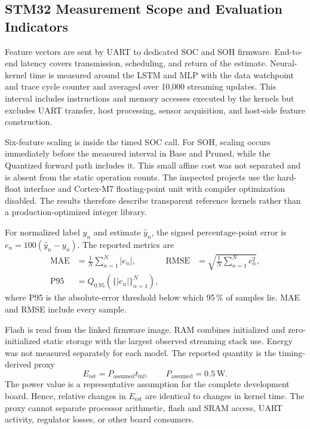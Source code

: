\documentclass[
    a4paper,
    12pt,
    titlepage,
    bibliography=totoc,
    twoside=on,
    parskip=false,
    numbers=noenddot,
    cleardoublepage=empty,
    DIV=12,
    BCOR=12.0mm,
    headheight=36pt,
    headings=openright
]{scrreprt}
\begin{document}
\subsection{STM32 Measurement Scope and Evaluation Indicators}
Feature vectors are sent by UART to dedicated SOC and SOH firmware. End-to-end latency covers transmission, scheduling, and return of the estimate. Neural-kernel time is measured around the LSTM and MLP with the data watchpoint and trace cycle counter and averaged over 10,000 streaming updates. This interval includes instructions and memory accesses executed by the kernels but excludes UART transfer, host processing, sensor acquisition, and host-side feature construction.

Six-feature scaling is inside the timed SOC call. For SOH, scaling occurs immediately before the measured interval in Base and Pruned, while the Quantized forward path includes it. This small affine cost was not separated and is absent from the static operation counts. The inspected projects use the hard-float interface and Cortex-M7 floating-point unit with compiler optimization disabled. The results therefore describe transparent reference kernels rather than a production-optimized integer library.

For normalized label $y_n$ and estimate $\hat y_n$, the signed percentage-point error is $e_n=100(\hat y_n-y_n)$. The reported metrics are
\begin{align}
    \mathrm{MAE}&=\frac{1}{N}\sum_{n=1}^{N}|e_n|, &
    \mathrm{RMSE}&=\sqrt{\frac{1}{N}\sum_{n=1}^{N}e_n^2}, \label{eq:embedded_error_metrics}\\
    \mathrm{P95}&=Q_{0.95}\!\left(\{|e_n|\}_{n=1}^{N}\right), \nonumber
\end{align}
where P95 is the absolute-error threshold below which 95\,\% of samples lie. MAE and RMSE include every sample.

Flash is read from the linked firmware image. RAM combines initialized and zero-initialized static storage with the largest observed streaming stack use. Energy was not measured separately for each model. The reported quantity is the timing-derived proxy
\begin{equation}
    E_{\mathrm{est}}=P_{\mathrm{assumed}}t_{\mathrm{inf}}, \qquad
    P_{\mathrm{assumed}}=\SI{0.5}{\watt}.
    \label{eq:embedded_energy_proxy}
\end{equation}
The power value is a representative assumption for the complete development board. Hence, relative changes in $E_{\mathrm{est}}$ are identical to changes in kernel time. The proxy cannot separate processor arithmetic, flash and SRAM access, UART activity, regulator losses, or other board consumers.
\end{document}
